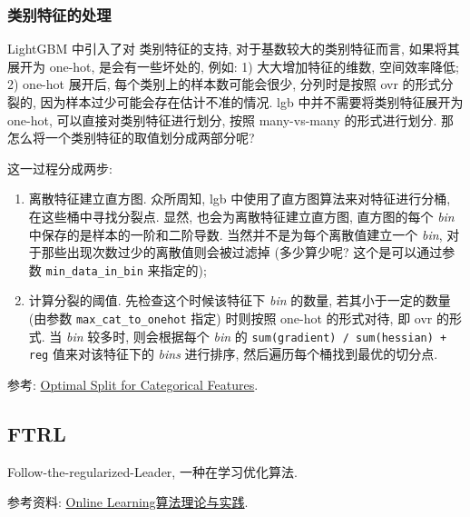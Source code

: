 \subsubsection{类别特征的处理}
LightGBM 中引入了对 类别特征的支持, 对于基数较大的类别特征而言, 如果将其展开为 one-hot, 是会有一些坏处的, 例如: 1) 大大增加特征的维数, 空间效率降低; 2) one-hot 展开后, 每个类别上的样本数可能会很少, 分列时是按照 ovr 的形式分裂的, 因为样本过少可能会存在估计不准的情况. lgb 中并不需要将类别特征展开为 one-hot, 可以直接对类别特征进行划分, 按照 many-vs-many 的形式进行划分. 那怎么将一个类别特征的取值划分成两部分呢?

这一过程分成两步:
\begin{enumerate}
	\item 离散特征建立直方图. 众所周知, lgb 中使用了直方图算法来对特征进行分桶, 在这些桶中寻找分裂点. 显然, 也会为离散特征建立直方图, 直方图的每个 \textit{bin} 中保存的是样本的一阶和二阶导数. 当然并不是为每个离散值建立一个 \textit{bin}, 对于那些出现次数过少的离散值则会被过滤掉 (多少算少呢? 这个是可以通过参数 \texttt{min_data_in_bin} 来指定的);
	
	\item 计算分裂的阈值. 先检查这个时候该特征下 \textit{bin} 的数量, 若其小于一定的数量 (由参数 \texttt{max_cat_to_onehot} 指定) 时则按照 one-hot 的形式对待, 即 ovr 的形式. 当 \textit{bin} 较多时, 则会根据每个 \textit{bin} 的 \texttt{sum(gradient) / sum(hessian) + reg} 值来对该特征下的 \textit{bins} 进行排序, 然后遍历每个桶找到最优的切分点.
\end{enumerate}

参考: \href{https://lightgbm.readthedocs.io/en/latest/Features.html#optimal-split-for-categorical-features}{Optimal Split for Categorical Features}.

\subsection{FTRL}
Follow-the-regularized-Leader\cite{hb_ftrl_2010_colt}, 一种在学习优化算法.

参考资料: \href{https://tech.meituan.com/2016/04/21/online-learning.html}{Online Learning算法理论与实践}.